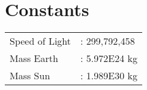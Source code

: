 
\label{app:Constants}
\chapter{Constants}

\begin{tabular}{l l}
	Speed of Light	& : 299,792,458				\\
	Mass Earth 		& : 5.972E24 kg	\\
	Mass Sun		& : 1.989E30 kg
\end{tabular}
